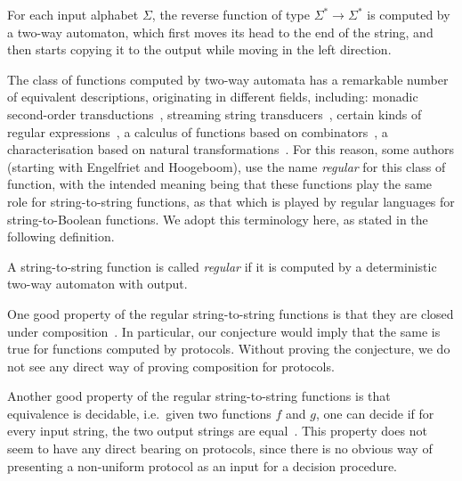     \begin{myexample}[Reverse]
        For each input alphabet $\Sigma$, the reverse function of type $\Sigma^* \to \Sigma^*$ is computed by a  two-way automaton, which first moves its head to the end of the string, and then starts copying it to the output while moving in the left direction.
    \end{myexample}

    The class of functions computed by two-way automata has a remarkable number of equivalent descriptions,  originating in different fields, including:  monadic second-order transductions~\cite[Section 4]{engelfrietMSODefinableString2001}, streaming string transducers~\cite[Section 3]{alurExpressivenessStreamingString2010},  certain kinds of regular expressions~\cite[Section 2]{alur2014regular}, a calculus of functions based on  combinators~\cite[Theorem 6.1]{bojanczykRegularFirstOrderList2018}, a characterisation based on natural transformations~\cite[Theorem 3.2]{bojanczykTitoRegular23}. For this reason, some authors (starting with Engelfriet and Hoogeboom), use the name \emph{regular} for this class of function, with the intended meaning being that these functions play the same role for string-to-string functions, as that which is played by regular languages for string-to-Boolean functions. We adopt this terminology here, as stated in the following definition.


    \begin{definition}
        \label{def:regular-string-to-string}
        A string-to-string function is called \emph{regular} if it is computed by a deterministic two-way automaton with output.
    \end{definition}
    
    
    One good  property of the regular string-to-string functions is that they  are closed under composition~\cite[Theorem 2]{chytilSerialComposition2Way1977}. In particular, our conjecture would imply that the same is true for functions computed by protocols. Without proving the conjecture, we do not see any direct way of proving composition for protocols.
     
    
    Another good property of the  regular string-to-string functions is that equivalence is decidable, i.e.~given two functions $f$ and $g$, one can decide if for every input string, the two output strings are equal~\cite[Theorem 1]{gurariEquivalenceProblemDeterministic1982}. This property does not seem to have any direct bearing on protocols, since there is no obvious way of presenting a non-uniform protocol as an input for a decision procedure.



